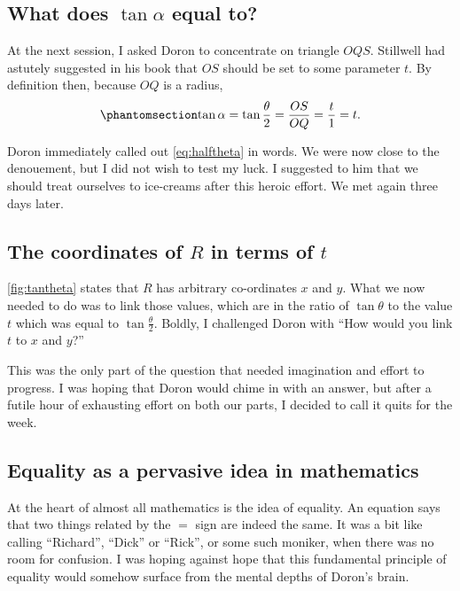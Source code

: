 \documentclass[
  a4paper,
]{article}
\begin{document}
\subsection{\texorpdfstring{What does \(\tan\alpha\) equal
to?}{What does \textbackslash tan\textbackslash alpha equal to?}}\label{what-does-tanalpha-equal-to}

At the next session, I asked Doron to concentrate on triangle \(OQS\).
Stillwell had astutely suggested in his book that \(OS\) should be set
to some parameter \(t\). By definition then, because \(OQ\) is a radius,
\begin{equation}\phantomsection\label{eq:halftheta}{
\tan\alpha = \tan\frac{\theta}{2} = \frac{OS}{OQ} = \frac{t}{1} = t.
}\end{equation}

Doron immediately called out \cref{eq:halftheta} in words. We were now
close to the denouement, but I did not wish to test my luck. I suggested
to him that we should treat ourselves to ice-creams after this heroic
effort. We met again three days later.

\subsection{\texorpdfstring{The coordinates of \(R\) in terms of
\(t\)}{The coordinates of R in terms of t}}\label{the-coordinates-of-r-in-terms-of-t}

\cref{fig:tantheta} states that \(R\) has arbitrary co-ordinates \(x\)
and \(y\). What we now needed to do was to link those values, which are
in the ratio of \(\tan\theta\) to the value \(t\) which was equal to
\(\tan\frac{\theta}{2}\). Boldly, I challenged Doron with ``How would
you link \(t\) to \(x\) and \(y\)?''

This was the only part of the question that needed imagination and
effort to progress. I was hoping that Doron would chime in with an
answer, but after a futile hour of exhausting effort on both our parts,
I decided to call it quits for the week.

\subsection{Equality as a pervasive idea in
mathematics}\label{equality-as-a-pervasive-idea-in-mathematics}

At the heart of almost all mathematics is the idea of equality. An
equation says that two things related by the \(=\) sign are indeed the
same. It was a bit like calling ``Richard'', ``Dick'' or ``Rick'', or
some such moniker, when there was no room for confusion. I was hoping
against hope that this fundamental principle of equality would somehow
surface from the mental depths of Doron's brain.
\end{document}
